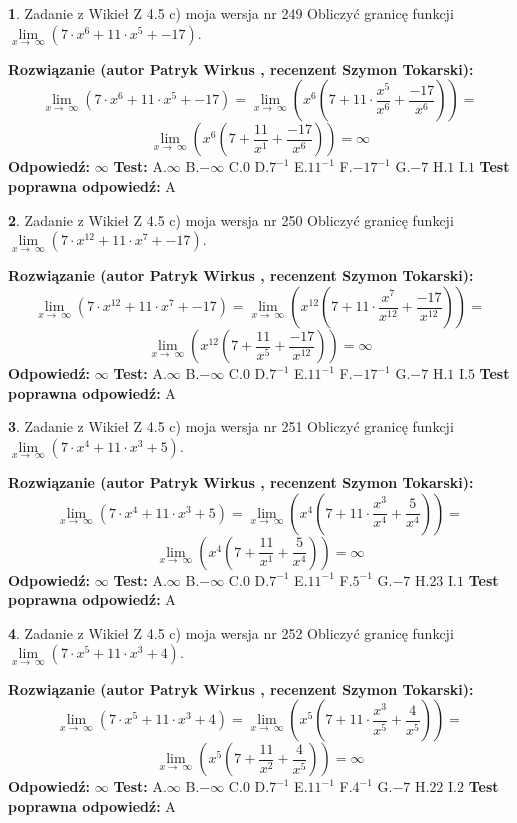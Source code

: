 \documentclass[12pt, a4paper]{article}
\theoremstyle{definition} %
\newtheorem{zad}{}
\newcommand{\zadStart}[1]{\begin{zad}#1\newline}
\newcommand{\zadStop}{\end{zad}}
\newcommand{\rozwStart}[2]{\noindent \textbf{Rozwiązanie (autor #1 , recenzent #2): }\newline}
\newcommand{\rozwStop}{\newline}
\newcommand{\odpStart}{\noindent \textbf{Odpowiedź:}\newline}
\newcommand{\odpStop}{\newline}
\newcommand{\testStart}{\noindent \textbf{Test:}\newline}
\newcommand{\testStop}{\newline}
\newcommand{\kluczStart}{\noindent \textbf{Test poprawna odpowiedź:}\newline}
\newcommand{\kluczStop}{\newline}
\begin{document}
\zadStart{Zadanie z Wikieł Z 4.5 c) moja wersja nr 249}
Obliczyć granicę funkcji  $\lim\limits_{x\to\ \infty}(7 \cdot x^{6}+11 \cdot x^{5}+-17)$.
\zadStop
\rozwStart{Patryk Wirkus}{Szymon Tokarski}
$$\lim\limits_{x\to\ \infty}(7 \cdot x^{6}+11 \cdot x^{5}+-17) = \lim\limits_{x\to\ \infty}(x^{6}(7 +11 \cdot \frac{x^{5}}{x^{6}}+\frac{-17}{x^{6}})) =$$ $$\lim\limits_{x\to\ \infty}(x^{6}(7 +\frac{11}{x^{1}}+\frac{-17}{x^{6}})) =\infty$$
\rozwStop
\odpStart
$\infty$
\odpStop
\testStart
A.$\infty$ B.$-\infty$ C.$0$ D.$7^{-1}$ E.$11^{-1}$
F.$-17^{-1}$ G.$-7$
H.$1$
I.$1$
\testStop
\kluczStart
A
\kluczStop



\zadStart{Zadanie z Wikieł Z 4.5 c) moja wersja nr 250}
Obliczyć granicę funkcji  $\lim\limits_{x\to\ \infty}(7 \cdot x^{12}+11 \cdot x^{7}+-17)$.
\zadStop
\rozwStart{Patryk Wirkus}{Szymon Tokarski}
$$\lim\limits_{x\to\ \infty}(7 \cdot x^{12}+11 \cdot x^{7}+-17) = \lim\limits_{x\to\ \infty}(x^{12}(7 +11 \cdot \frac{x^{7}}{x^{12}}+\frac{-17}{x^{12}})) =$$ $$\lim\limits_{x\to\ \infty}(x^{12}(7 +\frac{11}{x^{5}}+\frac{-17}{x^{12}})) =\infty$$
\rozwStop
\odpStart
$\infty$
\odpStop
\testStart
A.$\infty$ B.$-\infty$ C.$0$ D.$7^{-1}$ E.$11^{-1}$
F.$-17^{-1}$ G.$-7$
H.$1$
I.$5$
\testStop
\kluczStart
A
\kluczStop



\zadStart{Zadanie z Wikieł Z 4.5 c) moja wersja nr 251}
Obliczyć granicę funkcji  $\lim\limits_{x\to\ \infty}(7 \cdot x^{4}+11 \cdot x^{3}+5)$.
\zadStop
\rozwStart{Patryk Wirkus}{Szymon Tokarski}
$$\lim\limits_{x\to\ \infty}(7 \cdot x^{4}+11 \cdot x^{3}+5) = \lim\limits_{x\to\ \infty}(x^{4}(7 +11 \cdot \frac{x^{3}}{x^{4}}+\frac{5}{x^{4}})) =$$ $$\lim\limits_{x\to\ \infty}(x^{4}(7 +\frac{11}{x^{1}}+\frac{5}{x^{4}})) =\infty$$
\rozwStop
\odpStart
$\infty$
\odpStop
\testStart
A.$\infty$ B.$-\infty$ C.$0$ D.$7^{-1}$ E.$11^{-1}$
F.$5^{-1}$ G.$-7$
H.$23$
I.$1$
\testStop
\kluczStart
A
\kluczStop



\zadStart{Zadanie z Wikieł Z 4.5 c) moja wersja nr 252}
Obliczyć granicę funkcji  $\lim\limits_{x\to\ \infty}(7 \cdot x^{5}+11 \cdot x^{3}+4)$.
\zadStop
\rozwStart{Patryk Wirkus}{Szymon Tokarski}
$$\lim\limits_{x\to\ \infty}(7 \cdot x^{5}+11 \cdot x^{3}+4) = \lim\limits_{x\to\ \infty}(x^{5}(7 +11 \cdot \frac{x^{3}}{x^{5}}+\frac{4}{x^{5}})) =$$ $$\lim\limits_{x\to\ \infty}(x^{5}(7 +\frac{11}{x^{2}}+\frac{4}{x^{5}})) =\infty$$
\rozwStop
\odpStart
$\infty$
\odpStop
\testStart
A.$\infty$ B.$-\infty$ C.$0$ D.$7^{-1}$ E.$11^{-1}$
F.$4^{-1}$ G.$-7$
H.$22$
I.$2$
\testStop
\kluczStart
A
\kluczStop
\end{document}
